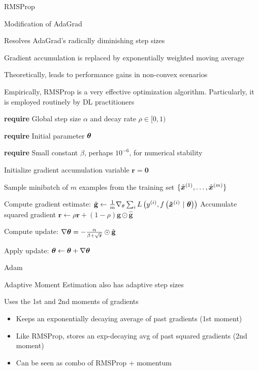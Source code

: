 \documentclass[11pt,compress,t,notes=noshow, xcolor=table]{beamer}
\begin{document}
\begin{framei}[fs=footnotesize]{RMSProp}
\item Modification of AdaGrad
\item Resolves AdaGrad's radically diminishing step sizes
\item Gradient accumulation is replaced by exponentially weighted moving average
\item Theoretically, leads to performance gains in non-convex scenarios
\item Empirically, RMSProp is a very effective optimization algorithm.
Particularly, it is employed routinely by DL practitioners
\vspace{-0.5em}\begin{algorithm}[H]
\footnotesize
\caption{RMSProp}
\begin{algorithmic}[1]
\State \textbf{require} Global step size $\alpha$ and decay rate $\rho \in [0, 1)$ \strut
\State \textbf{require} Initial parameter $\mathbf{\bm{\theta}}$ \strut
\State \parbox[t]{\dimexpr\linewidth-\algorithmicindent}{\textbf{require} Small constant $\beta$, perhaps $10^{-6}$, for numerical stability \strut}
\State Initialize gradient accumulation variable $\mathbf{r} = \mathbf{0} $
\State \parbox[t]{\dimexpr\linewidth-\algorithmicindent}{Sample minibatch of $m$ examples from the training set $\{\tilde{\bm{x}}^{(1)},\dots,\tilde{\bm{x}}^{(m)}\}$ \strut}
\State Compute gradient estimate: $\hat{\mathbf{g}} \leftarrow \frac{1}{m} \nabla_\theta \sum_{i} L\left(y^{(i)}, f\left(\bm{\tilde{x}}^{(i)} ~|~ \bm{\theta}\right)\right)$
\State Accumulate squared gradient $\mathbf{r} \leftarrow \rho \mathbf{r} + (1 - \rho) \hat{\mathbf{g}} \odot  \hat{\mathbf{g}}$
\State \parbox[t]{\dimexpr\linewidth-\algorithmicindent}{Compute update: $\nabla\mathbf{\bm{\theta}} = - \frac{\alpha}{\beta + \sqrt\mathbf{r}} \odot \hat{\mathbf{g}}$ \strut}
\State Apply update: $\mathbf{\bm{\theta}} \leftarrow \mathbf{\bm{\theta}} + \nabla\mathbf{\bm{\theta}}$
\EndWhile
\end{algorithmic}
\end{algorithm}
\end{framei}


\begin{framei}{Adam}
\item Adaptive Moment Estimation also has adaptive step sizes
\item Uses the 1st and 2nd moments of gradients
\begin{itemize}
\item Keeps an exponentially decaying average of past gradients (1st moment)
\item Like RMSProp, stores an exp-decaying avg of past squared gradients (2nd moment)
\item Can be seen as combo of RMSProp + momentum
\end{itemize}
\end{framei}
\end{document}
